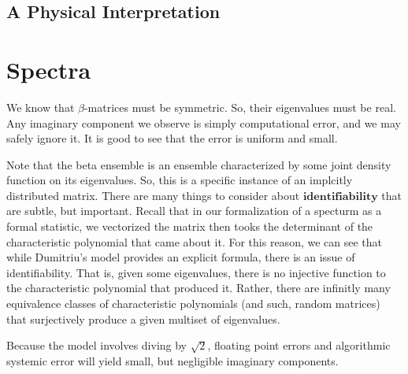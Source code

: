 \dumitriuALGORITHM


\subsection{A Physical Interpretation}






\newpage
\section{Spectra}

We know that $\beta$-matrices must be symmetric. So, their eigenvalues must be real. Any imaginary component we observe is simply computational error, and we may safely ignore it. It is good to see that the error is uniform and small.

\begin{remark}
Note that the beta ensemble is an ensemble characterized by some joint density function on its eigenvalues. So, this is a specific instance of an implcitly distributed matrix. There are many things to consider about $\textbf{identifiability}$ that are subtle, but important. Recall that in our formalization of a specturm as a formal statistic, we vectorized the matrix then tooks the determinant of the characteristic polynomial that came about it. For this reason, we can see that while Dumitriu's model provides an explicit formula, there is an issue of identifiability. That is, given some eigenvalues, there is no injective function to the characteristic polynomial that produced it. Rather, there are infinitly many equivalence classes of characteristic polynomials (and such, random matrices) that surjectively produce a given multiset of eigenvalues.
\end{remark}

\begin{remark}
Because the model involves diving by $\sqrt{2}$, floating point errors and algorithmic systemic error will yield small, but negligible imaginary components.
\end{remark}

